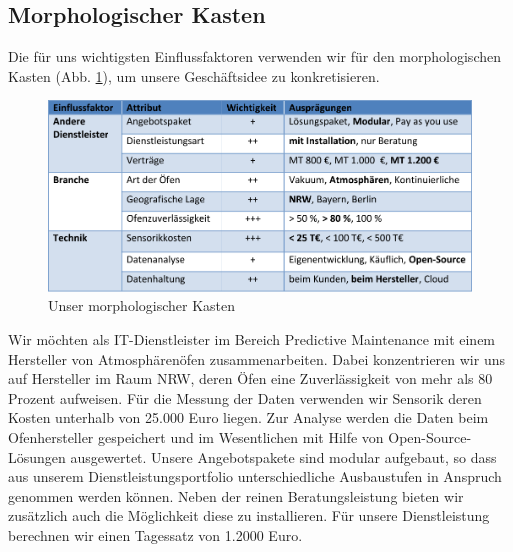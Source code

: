 \subsection{Morphologischer Kasten}
Die für uns wichtigsten Einflussfaktoren verwenden wir für den morphologischen Kasten (Abb. \ref{fig:MorphologischerKasten}), um unsere Geschäftsidee zu konkretisieren.

\begin{figure}[H]
\centering
\includegraphics[width=0.9\linewidth]{Bilder/MorphologischerKasten}
\caption{Unser morphologischer Kasten}
\label{fig:MorphologischerKasten}
\end{figure}

Wir möchten als IT-Dienstleister im Bereich Predictive Maintenance mit einem Hersteller von Atmosphärenöfen zusammenarbeiten. Dabei konzentrieren wir uns auf Hersteller im Raum NRW, deren Öfen eine Zuverlässigkeit von mehr als 80 Prozent aufweisen. Für die Messung der Daten verwenden wir Sensorik deren Kosten unterhalb von 25.000 Euro liegen. Zur Analyse werden die Daten beim Ofenhersteller gespeichert und im Wesentlichen mit Hilfe von Open-Source-Lösungen ausgewertet. Unsere Angebotspakete sind modular aufgebaut, so dass aus unserem Dienstleistungsportfolio unterschiedliche Ausbaustufen in Anspruch genommen werden können. Neben der reinen Beratungsleistung bieten wir zusätzlich auch die Möglichkeit diese zu installieren. Für unsere Dienstleistung berechnen wir einen Tagessatz von 1.2000 Euro.
